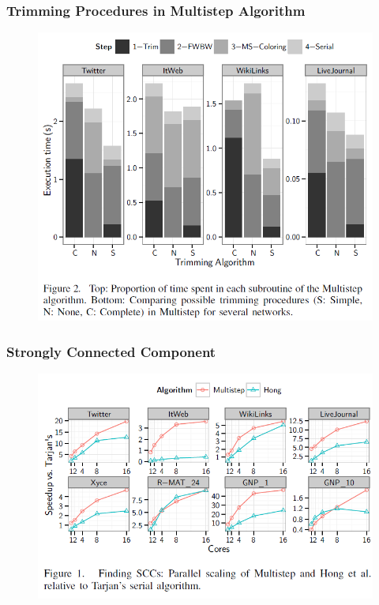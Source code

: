 \begin{frame}
	\frametitle{Trimming Procedures in Multistep Algorithm}
	\begin{figure}
		\includegraphics[scale=0.40]{figure/fig-result-p2.png}
	\end{figure}
\end{frame}

\begin{frame}
	\frametitle{Strongly Connected Component}
	\begin{figure}
		\includegraphics[scale=0.40]{figure/fig-result-f1.png}
	\end{figure}
\end{frame}

